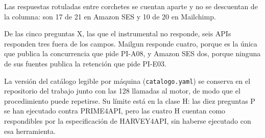 Las respuestas rotuladas entre corchetes se cuentan aparte y no se descuentan de la columna: son 17 de 21 en Amazon SES y 10 de 20 en Mailchimp.

De las cinco preguntas X, las que el instrumental no responde, seis APIs responden tres fuera de los campos.
Mailgun responde cuatro, porque es la única que publica la concurrencia que pide PI-A08, y Amazon SES dos, porque ninguna de sus fuentes publica la retención que pide PI-E03.

La versión del catálogo legible por máquina (\texttt{catalogo.yaml}) se conserva en el repositorio del trabajo junto con las 128 llamadas al motor, de modo que el procedimiento puede repetirse.
Su límite está en la clase H: las diez preguntas P se han ejecutado contra PRIME4API, pero las cuatro H cuentan como respondibles por la especificación de HARVEY4API, sin haberse ejecutado con esa herramienta.
